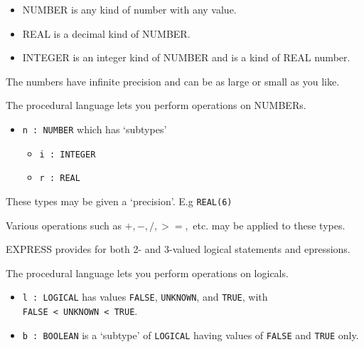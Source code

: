 \begin{remarks}
\remintro
{}

\begin{itemize}
\item NUMBER is any kind of number with any value.

\item REAL is a decimal kind of NUMBER.

\item INTEGER is an integer kind of NUMBER and is a kind of REAL number.
\end{itemize}

    The numbers have infinite precision and can be as large or small
as you like.

The procedural language lets you perform operations on NUMBERs.

\remend
\end{remarks}


\begin{itemize}
\item \verb|n : NUMBER| which has `subtypes'
  \begin{itemize}
  \item \verb|i : INTEGER|
  \item \verb|r : REAL|
  \end{itemize} 
\end{itemize}

These types may be given a `precision'. E.g \verb|REAL(6)|

Various operations such as $+, -, /, >=,$ etc. may be applied to these types.


\begin{remarks}
\remintro
{}

EXPRESS provides for both 2- and 3-valued logical statements and 
epressions.

The procedural language lets you perform operations on logicals.

\remend
\end{remarks}


\begin{itemize}
\item \verb|l : LOGICAL| has values \verb|FALSE|, \verb|UNKNOWN|, and
\verb|TRUE|, with \\
  \verb|FALSE < UNKNOWN < TRUE|.
\item \verb|b : BOOLEAN| is a `subtype' of \verb|LOGICAL| having values of
  \verb|FALSE| and \verb|TRUE| only.
\end{itemize}

